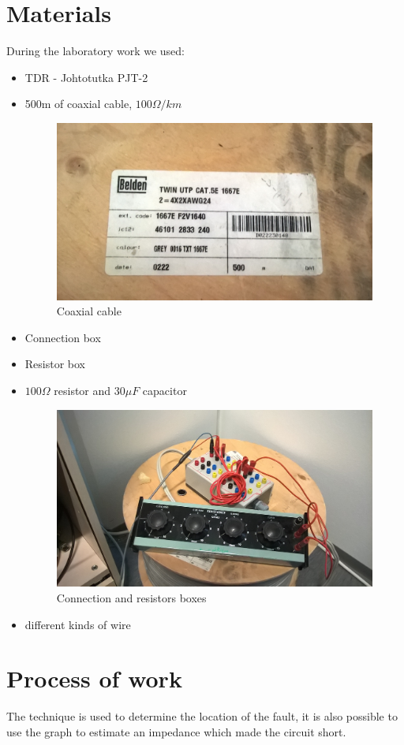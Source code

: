 \documentclass[english]{article}
\begin{document}
\section{Materials}
During the laboratory work we used:
\begin{itemize}
\item TDR - Johtotutka PJT-2
\item 500m of coaxial cable, $100\Omega/km$
\begin{figure}[H]
\centerline{\includegraphics[scale=0.1]{Radar/16}}
\caption{Coaxial cable}
\end{figure}
\item Connection box
\item Resistor box
\item $100\Omega$ resistor and $30\mu F$ capacitor
\begin{figure}[H]
\centerline{\includegraphics[scale=0.1]{Radar/15}}
\caption{Connection and resistors boxes}
\end{figure}
\item different kinds of wire
\end{itemize}
\section{Process of work}
The technique is used to determine the location of the fault, it is also possible to use the graph to estimate an impedance which made the circuit short.
\end{document}
